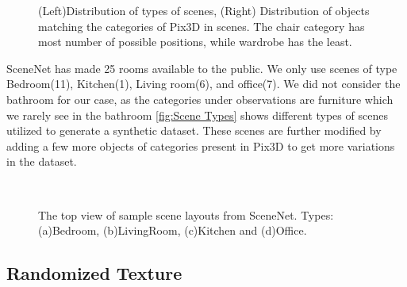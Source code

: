 \begin{figure}[!ht]
    \resizebox{0.49\textwidth}{6cm}{}
    \resizebox{0.49\textwidth}{6cm}{}
    \caption[Distribution of SceneNet.]{(Left)Distribution of types of scenes, (Right) Distribution of objects matching the categories of Pix3D in scenes.
    The chair category has most number of possible positions, while wardrobe has the least.}
    \label{fig:distribution of scenes}
\end{figure}

SceneNet has made 25 rooms available to the public.
We only use scenes of type Bedroom(11), Kitchen(1), Living room(6), and office(7).
We did not consider the bathroom for our case, as the categories under observations are furniture which we rarely see in the bathroom
\autoref{fig:Scene Types} shows different types of scenes utilized to generate a synthetic dataset.
These scenes are further modified by adding a few more objects of categories present in Pix3D to get more variations in the dataset.


\begin{figure}[!ht]
    \centering
    \quad
    \\
    \quad
    \caption[Top View for SceneNet Layouts]{The top view of sample scene layouts from SceneNet. Types: (a)Bedroom, (b)LivingRoom, (c)Kitchen and (d)Office.}
    \label{fig:Scene Types}
\end{figure}

\subsection{Randomized Texture}\label{subsec:randomised-texture}

